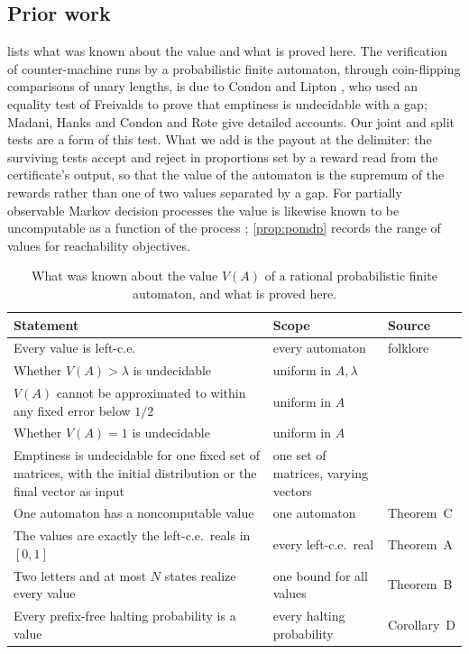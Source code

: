\documentclass[11pt]{article}
\theoremstyle{plain}
\theoremstyle{definition}
\theoremstyle{remark}
\begin{document}
\subsection{Prior work}

 lists what was known about the value and what is proved here. The verification of counter-machine runs by a probabilistic finite automaton, through coin-flipping comparisons of unary lengths, is due to Condon and Lipton \cite{CL89}, who used an equality test of Freivalds \cite{Fre81} to prove that emptiness is undecidable with a gap; Madani, Hanks and Condon \cite{MHC99,MHC03} and Rote \cite{Rot24} give detailed accounts. Our joint and split tests are a form of this test. What we add is the payout at the delimiter: the surviving tests accept and reject in proportions set by a reward read from the certificate's output, so that the value of the automaton is the supremum of the rewards rather than one of two values separated by a gap. For partially observable Markov decision processes the value is likewise known to be uncomputable as a function of the process \cite{MHC03}; \cref{prop:pomdp} records the range of values for reachability objectives.

\begin{table}[t]
\centering\small
\begin{tabularx}{\textwidth}{@{}>{\raggedright\arraybackslash}X >{\raggedright\arraybackslash}p{} >{\raggedright\arraybackslash}p{}@{}}
\toprule
Statement & Scope & Source\\
\midrule
Every value is left-c.e. & every automaton & folklore\\[3pt]
Whether $V(A)>\lambda$ is undecidable & uniform in $A,\lambda$ & \cite{NH69,Paz71}\\[3pt]
$V(A)$ cannot be approximated to within any fixed error below $1/2$ & uniform in $A$ & \cite{CL89,MHC03,Fij17}\\[3pt]
Whether $V(A)=1$ is undecidable & uniform in $A$ & \cite{GO10}\\[3pt]
Emptiness is undecidable for one fixed set of matrices, with the initial distribution or the final vector as input & one set of matrices, varying vectors & \cite{Rot24,Rot25}\\[3pt]
One automaton has a noncomputable value & one automaton & Theorem~C\\[3pt]
The values are exactly the left-c.e.\ reals in $[0,1]$ & every left-c.e.\ real & Theorem~A\\[3pt]
Two letters and at most $N$ states realize every value & one bound for all values & Theorem~B\\[3pt]
Every prefix-free halting probability is a value & every halting probability & Corollary~D\\
\bottomrule
\end{tabularx}
\caption{What was known about the value $V(A)$ of a rational probabilistic finite automaton, and what is proved here.}
\label{tab:landscape}
\end{table}
\end{document}
